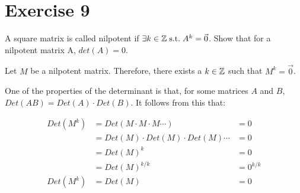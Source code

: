 \section*{Exercise 9}

A square matrix is called nilpotent if $\exists k \in \mathbb{Z} \; \text{s.t.}\; A^k = \vec{0}$. Show that for a nilpotent matrix A, $det(A) = 0$.

Let $M$ be a nilpotent matrix. Therefore, there exists a $k \in \mathbb{Z}$ such that $M^k = \vec{0}$. 

One of the properties of the determinant is that, for some matrices $A$ and $B$, $Det(AB) = Det(A) \cdot Det(B)$. It follows from this that:

\[
	\begin{aligned}
		Det(M^k) &= Det(M \cdot M \cdot M \cdots) &= 0\\
		&= Det(M) \cdot Det(M) \cdot Det(M) \cdots &= 0 \\
		&= Det(M)^k &= 0 \\
		&= Det(M)^{k/k} &= 0^{k/k} \\
		Det(M^k) &= Det(M) &= 0
	\end{aligned}
\]
